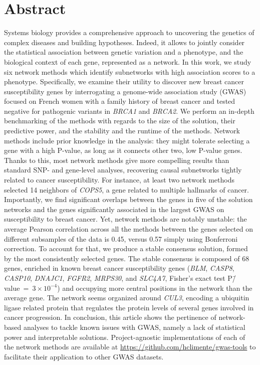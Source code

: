 \documentclass[10pt,letterpaper]{article}
\begin{document}
\section*{Abstract}
Systems biology provides a comprehensive approach to uncovering the genetics of complex diseases and building hypotheses. Indeed, it allows to jointly consider the statistical association between genetic variation and a phenotype, and the biological context of each gene, represented as a network. In this work, we study six network methods which identify subnetworks with high association scores to a phenotype. Specifically, we examine their utility to discover new breast cancer susceptibility genes by interrogating a genome-wide association study (GWAS) focused on French women with a family history of breast cancer and tested negative for pathogenic variants in \emph{BRCA1} and \emph{BRCA2}. We perform an in-depth benchmarking of the methods with regards to the size of the solution, their predictive power, and the stability and the runtime of the methods. Network methods include prior knowledge in the analysis: they might tolerate selecting a gene with a high P-value, as long as it connects other two, low P-value genes. Thanks to this, most network methods give more compelling results than standard SNP- and gene-level analyses, recovering causal subnetworks tightly related to cancer susceptibility. For instance, at least two network methods selected 14 neighbors of \emph{COPS5}, a gene related to multiple hallmarks of cancer. Importantly, we find significant overlaps between the genes in five of the solution networks and the genes significantly associated in the largest GWAS on susceptibility to breast cancer. Yet, network methods are notably unstable: the average Pearson correlation across all the methods between the genes selected on different subsamples of the data is 0.45, versus 0.57 simply using Bonferroni correction. To account for that, we produce a stable consensus solution, formed by the most consistently selected genes. The stable consensus is composed of 68 genes, enriched in known breast cancer susceptibility genes (\emph{BLM}, \emph{CASP8}, \emph{CASP10}, \emph{DNAJC1}, \emph{FGFR2}, \emph{MRPS30}, and \emph{SLC4A7}, Fisher's exact test P\=/value~=~$3 \times 10^{-4}$) and occupying more central positions in the network than the average gene. The network seems organized around \emph{CUL3}, encoding a ubiquitin ligase related protein that regulates the protein levels of several genes involved in cancer progression. In conclusion, this article shows the pertinence of network-based analyses to tackle known issues with GWAS, namely a lack of statistical power and interpretable solutions. Project-agnostic implementations of each of the network methods are available at \url{https://github.com/hclimente/gwas-tools} to facilitate their application to other GWAS datasets.
\end{document}
